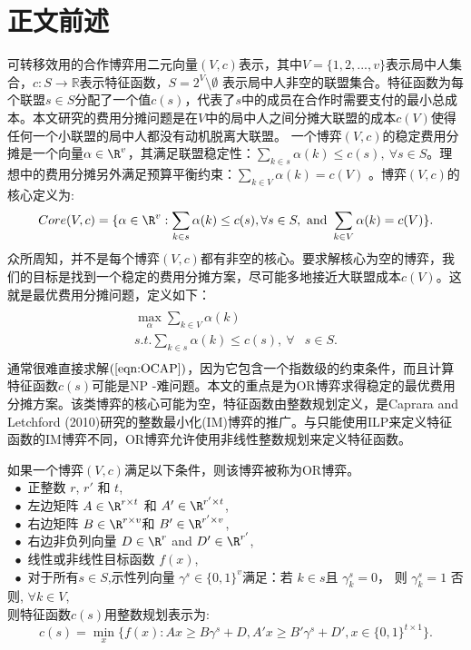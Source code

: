 \documentclass[UTF8]{article}
\begin{document}
\section{正文前述}
可转移效用的合作博弈用二元向量$(V,c)$表示，其中$V = \{1,2,...,v\}$表示局中人集合，$c:S \rightarrow \mathbb{R}$表示特征函数，$S= 2^V \setminus \emptyset$ 表示局中人非空的联盟集合。特征函数为每个联盟$s\in S$分配了一个值$c(s)$，代表了$s$中的成员在合作时需要支付的最小总成本。本文研究的费用分摊问题是在$V$中的局中人之间分摊大联盟的成本$c(V)$使得任何一个小联盟的局中人都没有动机脱离大联盟。
一个博弈$(V,c)$的稳定费用分摊是一个向量$\alpha \in \R^{v}$，其满足联盟稳定性：$\sum_{k \in s} \alpha(k) \leq c(s),~ \forall s \in S$。理想中的费用分摊另外满足预算平衡约束：$\sum_{k \in V} \alpha(k) = c( V)$ 。博弈$(V,c)$的核心定义为:
\begin {equation*} \label{eqn:budgetbalance}
Core(V,c)=\{\alpha \in \R^{v}:\sum_{k \in s} \alpha(k) \leq c(s),\forall s \in S, \mbox{ and } \sum_{k \in V} \alpha(k) = c( V)\}.
\end {equation*}
众所周知，并不是每个博弈$(V,c)$都有非空的核心。要求解核心为空的博弈，我们的目标是找到一个稳定的费用分摊方案，尽可能多地接近大联盟成本$c(V)$。这就是最优费用分摊问题，定义如下：
\begin{eqnarray}\label{eqn:OCAP}
\begin{aligned}
\begin{split}
\max_{\alpha} \sum_{k \in V} \alpha(k)&\\
s.t. \sum_{k \in s} \alpha(k) \leq  c(s),~ \forall &s \in S.
\end{split}
\end{aligned}
\end{eqnarray}
通常很难直接求解$(\ref{eqn:OCAP})$，因为它包含一个指数级的约束条件，而且计算特征函数$c(s)$可能是NP -难问题。本文的重点是为OR博弈求得稳定的最优费用分摊方案。该类博弈的核心可能为空，特征函数由整数规划定义，是Caprara and Letchford (2010)研究的整数最小化(IM)博弈的推广。与只能使用ILP来定义特征函数的IM博弈不同，OR博弈允许使用非线性整数规划来定义特征函数。

\begin{Definition}\label{def2}
如果一个博弈$(V,c)$满足以下条件，则该博弈被称为OR博弈。\\
$~~\bullet$
正整数 $r$, $r'$ 和 $t$,\\
$~~\bullet$ 左边矩阵 $A \in \R^{r \times t}$ 和 $A' \in \R^{r' \times t}$,\\
$~~\bullet$ 右边矩阵 $B \in \R^{r \times v}$和 $B' \in \R^{r' \times v}$,\\
$~~\bullet$ 右边非负列向量 $D \in \R^{r}$ and $D' \in \R^{r'}$,\\
$~~\bullet$ 线性或非线性目标函数 $f(x)$,\\
$~~\bullet$ 对于所有$s \in S$,示性列向量 $\gamma^s \in \{0,1\}^v$满足：若 $k \in s$且 $\gamma_k^s=0$， 则 $\gamma_k^s=1$ 否则, $\forall k \in V$,\\
则特征函数$c(s)$用整数规划表示为:
\begin{equation}\label{eqn:orgc}
c(s) = \min_{x} \big\{ f(x):Ax \geq B\gamma^s + D, A'x \geq B'\gamma^s + D', x \in \{0,1\}^{t \times 1} \big\}.
\end{equation}
\end{Definition}
\end{document}
